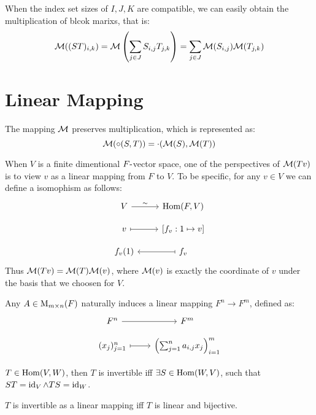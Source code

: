 When the index set sizes of $I, J, K$ are compatible, we can easily obtain the multiplication of blcok marixs, that is:
\begin{equation*}
    {\cal M}((ST)_{i, k}) = {\cal M} \left( \sum_{j \in J} S_{i, j} T_{j, k} \right) = \sum_{j \in J} {\cal M}(S_{i, j}) {\cal M}(T_{j, k})
\end{equation*}







\section{Linear Mapping}

The mapping ${\cal M}$ preserves multiplication, which is represented as:
\begin{equation*}
    {\cal M}(\circ(S, T)) = \cdot({\cal M}(S), {\cal M}(T))
\end{equation*}

When $V$ is a finite dimentional $F\mbox{-}$vector space, one of the perspectives of ${\cal M}(Tv)$ is to view $v$ as a linear mapping from $F$ to $V$. To be specific, for any $v \in V$ we can define a isomophism as follows:
\[
    \begin{tikzcd}[row sep=small]
        V \arrow[r, "\sim"]
        & \Hom(F, V) \\
        v \arrow[mapsto, r]
        & \left[ f_v: 1 \mapsto v \right] \\
        f_v(1)
        & f_v \arrow[mapsto, l]
    \end{tikzcd}
\]
Thus ${\cal M}(Tv) = {\cal M}(T){\cal M}(v)$, where ${\cal M}(v)$ is exactly the coordinate of $v$ under the basis that we choosen for $V$.

Any $A \in \mathrm{M}_{m \times n}(F)$ naturally induces a linear mapping $F^n \to F^m$, defined as:
\[
    \begin{tikzcd}[row sep=small]
        F^n \arrow[r]
        & F^m
        \\
        (x_j)_{j=1}^n  \arrow[mapsto, r]
        & \left( \sum_{j=1}^n a_{i, j} x_j \right)_{i=1}^m
    \end{tikzcd}
\]






\begin{definition}
    $T \in \operatorname{Hom}(V, W)$, then $T$ is invertible iff $\exists S \in \operatorname{Hom}(W, V)$, such that $ST = \operatorname{id}_{V} \land TS=\operatorname{id}_{W}$.
\end{definition}
\begin{proposition}
    $T$ is invertible as a linear mapping iff $T$ is linear and bijective. 
\end{proposition}






